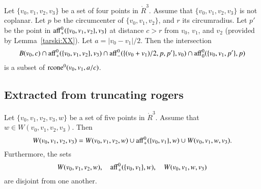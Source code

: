 \begin{tarskidata}
\begin{tarski}

\begin{lemma}
Let $\{v_0,v_1,v_2,v_3\}$ be a set of four points in $\ring{R}^3$.
Assume that $\{v_0,v_1,v_2,v_3\}$ is not coplanar.  Let $p$
be the circumcenter of $\{v_0,v_1,v_2\}$, and $r$ its circumradius.  
Let $p'$ be the
point in ${\operatorname{aff}}_+^0(\{v_0,v_1,v_2\},v_3\}$ at distance
$c > r$ from $v_0$, $v_1$, and $v_2$ (provided by Lemma~\ref{tarski:XX}).
Let $a = |v_0-v_1|/2$.
Then the intersection
  $$
  B(v_0,c)\cap
  {\operatorname{aff}}^0_+(\{v_0,v_1,v_2\},v_3) \cap
  {\operatorname{aff}}^0_-(\{(v_0+v_1)/2,p,p' \},v_0) \cap
  {\operatorname{aff}}^0_0(\{v_0,v_1,p'\},p)
  $$
is a subset of ${\operatorname{rcone}}^0(v_0,v_1,a/c)$.
\end{lemma}

\begin{proved}
\swallowed\end{proved}
\end{tarski}







\begin{tarski}
\section{Extracted from truncating rogers}

\begin{lemma}
Let $\{v_0,v_1,v_2,v_3,w\}$ be a set of five points in $\ring{R}^3$.
Assume that $w\in W(v_0,v_1,v_2,v_3)$. Then
$$
W(v_0,v_1,v_2,v_3) = W(v_0,v_1,v_2,w) \cup {\operatorname{aff}}_+^0(\{v_0,v_1\},w)
\cup W(v_0,v_1,w,v_3).
$$
Furthermore, the sets
$$
W(v_0,v_1,v_2,w),\quad {\operatorname{aff}}_+^0(\{v_0,v_1\},w),\quad
W(v_0,v_1,w,v_3)
$$
are disjoint from one another.
\end{lemma}

\begin{proved}
\swallowed\end{proved}
\end{tarski}






\end{tarskidata}

